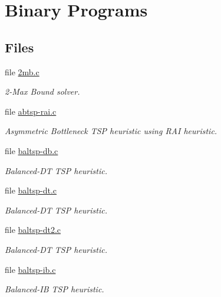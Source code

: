 \hypertarget{group__bin}{
\section{Binary Programs}
\label{group__bin}
}
\subsection*{Files}
\begin{CompactItemize}
\item 
file \hyperlink{bin_22mb_8c}{2mb.c}
\begin{CompactList}\small\item\em 2-Max Bound solver. \item\end{CompactList}

\item 
file \hyperlink{abtsp-rai_8c}{abtsp-rai.c}
\begin{CompactList}\small\item\em Asymmetric Bottleneck TSP heuristic using RAI heuristic. \item\end{CompactList}

\item 
file \hyperlink{bin_2baltsp-db_8c}{baltsp-db.c}
\begin{CompactList}\small\item\em Balanced-DT TSP heuristic. \item\end{CompactList}

\item 
file \hyperlink{bin_2baltsp-dt_8c}{baltsp-dt.c}
\begin{CompactList}\small\item\em Balanced-DT TSP heuristic. \item\end{CompactList}

\item 
file \hyperlink{bin_2baltsp-dt2_8c}{baltsp-dt2.c}
\begin{CompactList}\small\item\em Balanced-DT TSP heuristic. \item\end{CompactList}

\item 
file \hyperlink{bin_2baltsp-ib_8c}{baltsp-ib.c}
\begin{CompactList}\small\item\em Balanced-IB TSP heuristic. \item\end{CompactList}


\end{CompactItemize}
